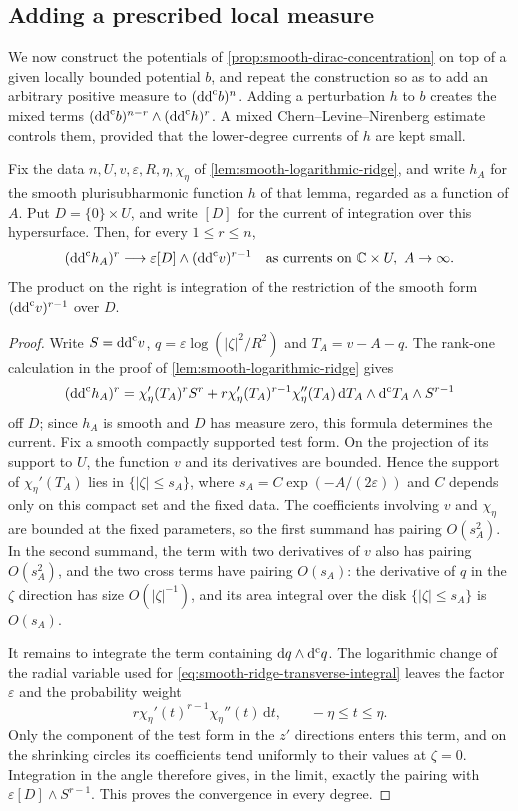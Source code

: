 \subsection{Adding a prescribed local measure}
\label{subsec:local-prescribed-excess}

We now construct the potentials of \cref{prop:smooth-dirac-concentration} on top of a given locally bounded potential $b$, and repeat the construction so as to add an arbitrary positive measure to $(\mathrm{dd}^{\mathrm{c}} b)^n$. Adding a perturbation $h$ to $b$ creates the mixed terms $(\mathrm{dd}^{\mathrm{c}} b)^{n-r}\wedge(\mathrm{dd}^{\mathrm{c}} h)^r$. A mixed Chern--Levine--Nirenberg estimate controls them, provided that the lower-degree currents of $h$ are kept small.

\begin{lemma}\label{lem:ridge-lower-degree-limit}
Fix the data $n,U,v,\varepsilon,R,\eta,\chi_\eta$ of \cref{lem:smooth-logarithmic-ridge}, and write $h_A$ for the smooth plurisubharmonic function $h$ of that lemma, regarded as a function of $A$. Put $D=\{0\}\times U$, and write $[D]$ for the current of integration over this hypersurface. Then, for every $1\leq r\leq n$,
\[
 (\mathrm{dd}^{\mathrm{c}} h_A)^r\longrightarrow
       \varepsilon[D]\wedge(\mathrm{dd}^{\mathrm{c}} v)^{r-1}
 \quad\text{as currents on }\mathbb C\times U,\ A\to\infty.
\]
The product on the right is integration of the restriction of the smooth form $(\mathrm{dd}^{\mathrm{c}} v)^{r-1}$ over $D$.
\end{lemma}
\begin{proof}
Write $S=\mathrm{dd}^{\mathrm{c}} v$, $q=\varepsilon\log(|\zeta|^2/R^2)$ and $T_A=v-A-q$. The rank-one calculation in the proof of \cref{lem:smooth-logarithmic-ridge} gives
\[
 (\mathrm{dd}^{\mathrm{c}} h_A)^r=\chi_\eta'(T_A)^rS^r
       +r\chi_\eta'(T_A)^{r-1}\chi_\eta''(T_A)
                   \,\mathrm dT_A\wedge\mathrm d^{\mathrm c} T_A\wedge S^{r-1}
\]
off $D$; since $h_A$ is smooth and $D$ has measure zero, this formula determines the current. Fix a smooth compactly supported test form. On the projection of its support to $U$, the function $v$ and its derivatives are bounded. Hence the support of $\chi_\eta'(T_A)$ lies in $\{|\zeta|\leq s_A\}$, where $s_A=C\exp(-A/(2\varepsilon))$ and $C$ depends only on this compact set and the fixed data. The coefficients involving $v$ and $\chi_\eta$ are bounded at the fixed parameters, so the first summand has pairing $O(s_A^2)$. In the second summand, the term with two derivatives of $v$ also has pairing $O(s_A^2)$, and the two cross terms have pairing $O(s_A)$: the derivative of $q$ in the $\zeta$ direction has size $O(|\zeta|^{-1})$, and its area integral over the disk $\{|\zeta|\leq s_A\}$ is $O(s_A)$.

It remains to integrate the term containing $\mathrm dq\wedge\mathrm d^{\mathrm c} q$. The logarithmic change of the radial variable used for \eqref{eq:smooth-ridge-transverse-integral} leaves the factor $\varepsilon$ and the probability weight
\[
 r\chi_\eta'(t)^{r-1}\chi_\eta''(t)\,\mathrm dt,
 \qquad -\eta\leq t\leq\eta.
\]
Only the component of the test form in the $z'$ directions enters this term, and on the shrinking circles its coefficients tend uniformly to their values at $\zeta=0$. Integration in the angle therefore gives, in the limit, exactly the pairing with $\varepsilon[D]\wedge S^{r-1}$. This proves the convergence in every degree.
\end{proof}

